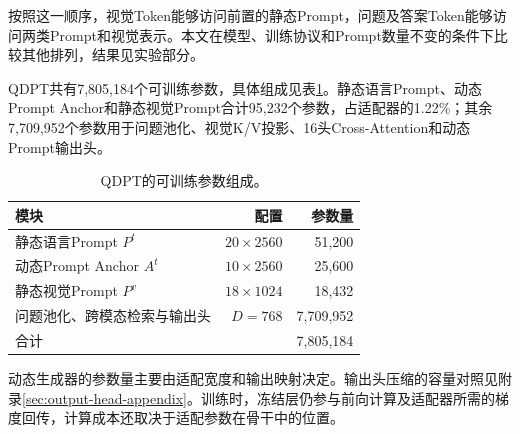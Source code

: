 按照这一顺序，视觉Token能够访问前置的静态Prompt，问题及答案Token能够访问两类Prompt和视觉表示。本文在模型、训练协议和Prompt数量不变的条件下比较其他排列，结果见实验部分。

QDPT共有7,805,184个可训练参数，具体组成见表\ref{tab:trainable-params}。静态语言Prompt、动态Prompt Anchor和静态视觉Prompt合计95,232个参数，占适配器的1.22\%；其余7,709,952个参数用于问题池化、视觉K/V投影、16头Cross-Attention和动态Prompt输出头。

\begin{table}[t]
    \centering
    \caption{QDPT的可训练参数组成。}
    \label{tab:trainable-params}
    \begin{tabular}{lrr}
        \toprule
        模块 & 配置 & 参数量 \\
        \midrule
        静态语言Prompt $P^{t}$ & $20\times2560$ & 51,200 \\
        动态Prompt Anchor $A^{t}$ & $10\times2560$ & 25,600 \\
        静态视觉Prompt $P^{v}$ & $18\times1024$ & 18,432 \\
        问题池化、跨模态检索与输出头 & $D=768$ & 7,709,952 \\
        \midrule
        合计 &  & 7,805,184 \\
        \bottomrule
    \end{tabular}
\end{table}

动态生成器的参数量主要由适配宽度和输出映射决定。输出头压缩的容量对照见附录\ref{sec:output-head-appendix}。训练时，冻结层仍参与前向计算及适配器所需的梯度回传，计算成本还取决于适配参数在骨干中的位置。
